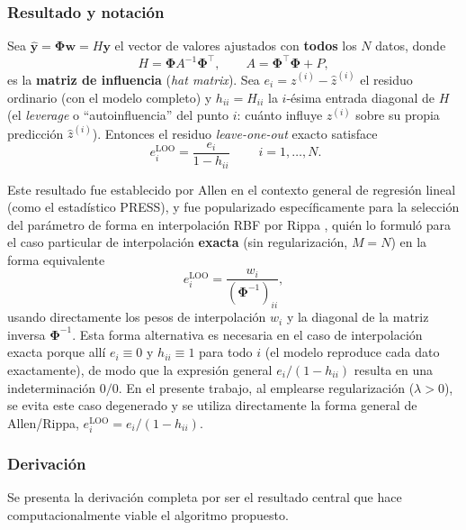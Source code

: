 \documentclass[11pt,a4paper]{article}
\newcommand{\Phimat}{\boldsymbol{\Phi}}
\newcommand{\wvec}{\mathbf{w}}
\newcommand{\yvec}{\mathbf{y}}
\begin{document}
\subsubsection{Resultado y notaci\'on}

Sea $\hat{\yvec} = \Phimat\wvec = H\yvec$ el vector de valores ajustados con
\textbf{todos} los $N$ datos, donde
\[
H = \Phimat A^{-1} \Phimat^{\!\top}, \qquad A = \Phimat^{\!\top}\Phimat + P,
\]
es la \textbf{matriz de influencia} (\emph{hat matrix}). Sea $e_i = z^{(i)} -
\hat z^{(i)}$ el residuo ordinario (con el modelo completo) y $h_{ii} =
H_{ii}$ la $i$-\'esima entrada diagonal de $H$ (el \emph{leverage} o
``autoinfluencia'' del punto $i$: cu\'anto influye $z^{(i)}$ sobre su propia
predicci\'on $\hat z^{(i)}$). Entonces el residuo \emph{leave-one-out} exacto
satisface
\[
\boxed{\; e_i^{\text{LOO}} = \dfrac{e_i}{1-h_{ii}} \;}
\qquad i = 1,\dots,N.
\]

Este resultado fue establecido por Allen \cite{allen1974} en el contexto
general de regresi\'on lineal (como el estad\'istico PRESS), y fue popularizado
espec\'ificamente para la selecci\'on del par\'ametro de forma en
interpolaci\'on RBF por Rippa \cite{rippa1999}, qui\'en lo formul\'o para el
caso particular de interpolaci\'on \textbf{exacta} (sin regularizaci\'on,
$M=N$) en la forma equivalente
\[
e_i^{\text{LOO}} = \frac{w_i}{\left(\Phimat^{-1}\right)_{ii}},
\]
usando directamente los pesos de interpolaci\'on $w_i$ y la diagonal de la
matriz inversa $\Phimat^{-1}$. Esta forma alternativa es necesaria en el caso
de interpolaci\'on exacta porque all\'i $e_i \equiv 0$ y $h_{ii} \equiv 1$
para todo $i$ (el modelo reproduce cada dato exactamente), de modo que la
expresi\'on general $e_i/(1-h_{ii})$ resulta en una indeterminaci\'on $0/0$.
En el presente trabajo, al emplearse regularizaci\'on ($\lambda>0$), se evita
este caso degenerado y se utiliza directamente la forma general de
Allen/Rippa, $e_i^{\text{LOO}}=e_i/(1-h_{ii})$.

\subsubsection{Derivaci\'on}

Se presenta la derivaci\'on completa por ser el resultado central que hace
computacionalmente viable el algoritmo propuesto.
\end{document}
